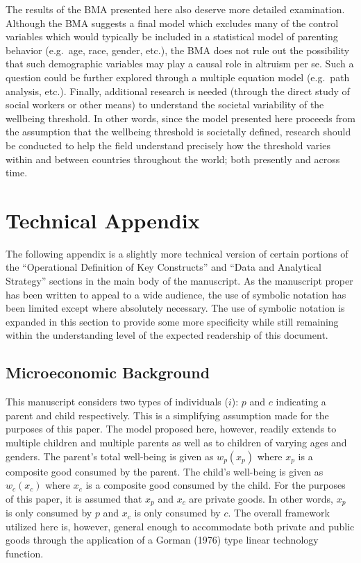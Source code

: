 \documentclass[review]{elsarticle}\usepackage[]{graphicx}\usepackage[]{color}
\begin{document}
The results of the BMA presented here also deserve more detailed
examination. Although the BMA suggests a final model which excludes many
of the control variables which would typically be included in a
statistical model of parenting behavior (e.g.~age, race, gender, etc.),
the BMA does not rule out the possibility that such demographic
variables may play a causal role in altruism per se. Such a question
could be further explored through a multiple equation model (e.g.~path
analysis, etc.). Finally, additional research is needed (through the
direct study of social workers or other means) to understand the
societal variability of the wellbeing threshold. In other words, since
the model presented here proceeds from the assumption that the wellbeing
threshold is societally defined, research should be conducted to help
the field understand precisely how the threshold varies within and
between countries throughout the world; both presently and across time.

\section{Technical Appendix}\label{technical-appendix}

The following appendix is a slightly more technical version of certain
portions of the ``Operational Definition of Key Constructs'' and ``Data
and Analytical Strategy'' sections in the main body of the manuscript.
As the manuscript proper has been written to appeal to a wide audience,
the use of symbolic notation has been limited except where absolutely
necessary. The use of symbolic notation is expanded in this section to
provide some more specificity while still remaining within the
understanding level of the expected readership of this document.

\subsection{Microeconomic Background}\label{microeconomic-background-1}

This manuscript considers two types of individuals ($i$): $p$ and $c$
indicating a parent and child respectively. This is a simplifying
assumption made for the purposes of this paper. The model proposed here,
however, readily extends to multiple children and multiple parents as
well as to children of varying ages and genders. The parent's total
well-being is given as $w_p(x_p)$ where $x_p$ is a composite good
consumed by the parent. The child's well-being is given as $w_c(x_c)$
where $x_c$ is a composite good consumed by the child. For the purposes
of this paper, it is assumed that $x_p$ and $x_c$ are private goods. In
other words, $x_p$ is only consumed by $p$ and $x_c$ is only consumed by
$c$. The overall framework utilized here is, however, general enough to
accommodate both private and public goods through the application of a
Gorman (1976) type linear technology function.
\end{document}
